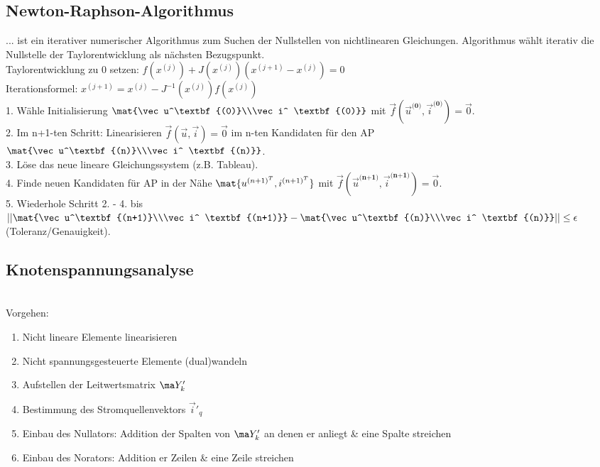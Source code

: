 \documentclass[fs, footer]{latex4ei}
\begin{document}
\begin{multicols*}{4}
    \subsection{Newton-Raphson-Algorithmus}
    ... ist ein iterativer numerischer Algorithmus zum Suchen der Nullstellen von nichtlinearen Gleichungen. Algorithmus wählt iterativ die Nullstelle der Taylorentwicklung als nächsten Bezugspunkt.\\
    Taylorentwicklung zu 0 setzen: $f(x^{(j)}) + J(x^{(j)})(x^{(j+1)}-x^{(j)})=0$\\
    Iterationsformel: $x^{(j+1)} = x^{(j)} - J^{-1}(x^{(j)})f(x^{(j)})$\\
    1. Wähle Initialisierung $\mat{\vec u^\textbf{(0)}\\\vec i^ \textbf{(0)}}$ mit $\vec f(\vec u^\textbf{(0)}, \vec i^\textbf{(0)}) = \vec{0}$.\\
    2. Im n+1-ten Schritt: Linearisieren $\vec f(\vec u, \vec i) = \vec 0$ im n-ten Kandidaten für den AP $\mat{\vec u^\textbf{(n)}\\\vec i^ \textbf{(n)}}$.\\
    3. Löse das neue lineare Gleichungssystem (z.B. Tableau).\\
    4. Finde neuen Kandidaten für AP in der Nähe $\mat{u^{(n+1)^T}, i^{(n+1)^T}}$ mit $\vec f(\vec u^\textbf{(n+1)}, \vec i^ \textbf{(n+1)}) = \vec 0$.\\
    5. Wiederhole Schritt 2. - 4. bis $\left|\left|\mat{\vec u^\textbf{(n+1)}\\\vec i^ \textbf{(n+1)}}-\mat{\vec u^\textbf{(n)}\\\vec i^ \textbf{(n)}}\right|\right| \leq \epsilon$ (Toleranz/Genauigkeit).


    \subsection{Knotenspannungsanalyse}
    \\
    Vorgehen:
    \begin{enumerate}\itemsep0pt
        \item Nicht lineare Elemente linearisieren
        \item Nicht spannungsgesteuerte Elemente (dual)wandeln
        \item Aufstellen der Leitwertsmatrix $\ma Y'_k$
        \item Bestimmung des Stromquellenvektors $\vec i'_q$
        \item Einbau des Nullators: Addition der Spalten von $\ma Y'_k$ an denen er anliegt \& eine Spalte streichen
        \item Einbau des Norators: Addition er Zeilen \& eine Zeile streichen


\end{enumerate}
\end{multicols*}
\end{document}
